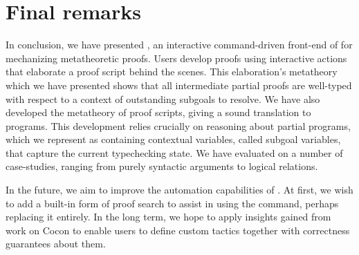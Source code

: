 
\section{Final remarks}

In conclusion, we have presented \Harpoon, an interactive command-driven
front-end of \Beluga{} for mechanizing metatheoretic proofs.
Users develop proofs using interactive actions that elaborate a proof script
behind the scenes.
This elaboration's metatheory which we have presented shows that all
intermediate partial proofs are well-typed with respect to a context of
outstanding subgoals to resolve.
We have also developed the metatheory of proof scripts, giving a sound
translation to \Beluga{} programs.
This development relies crucially on reasoning about partial programs, which we
represent as containing contextual variables, called subgoal variables, that
capture the current typechecking state.
We have evaluated \Harpoon{} on a number of case-studies, ranging from purely
syntactic arguments to logical relations.

In the future, we aim to improve the automation capabilities of \Harpoon.
At first, we wish to add a built-in form of proof search to assist in using the
\ttsolves command, perhaps replacing it entirely. In the long term, we hope to
apply insights gained from work on Cocon \cite{cocon} to enable users to define
custom tactics together with correctness guarantees about them.

